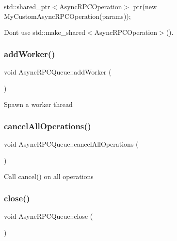 std\+::shared\+\_\+ptr$<$\+Async\+R\+P\+C\+Operation$>$ ptr(new My\+Custom\+Async\+R\+P\+C\+Operation(params));

Don\textquotesingle{}t use std\+::make\+\_\+shared$<$\+Async\+R\+P\+C\+Operation$>$(). \mbox{\label{class_async_r_p_c_queue_a05370bb335972acfb00fd8c4e4f90db8}} 
\subsubsection{\texorpdfstring{add\+Worker()}{addWorker()}}
{\footnotesize\ttfamily void Async\+R\+P\+C\+Queue\+::add\+Worker (\begin{DoxyParamCaption}{ }\end{DoxyParamCaption})}

Spawn a worker thread \mbox{\label{class_async_r_p_c_queue_aa22de6b56261448ff6d468e27f630d7b}} 
\subsubsection{\texorpdfstring{cancel\+All\+Operations()}{cancelAllOperations()}}
{\footnotesize\ttfamily void Async\+R\+P\+C\+Queue\+::cancel\+All\+Operations (\begin{DoxyParamCaption}{ }\end{DoxyParamCaption})}

Call cancel() on all operations \mbox{\label{class_async_r_p_c_queue_a233be6530494331038507ad60f1d8428}} 
\subsubsection{\texorpdfstring{close()}{close()}}
{\footnotesize\ttfamily void Async\+R\+P\+C\+Queue\+::close (\begin{DoxyParamCaption}{ }\end{DoxyParamCaption})}

